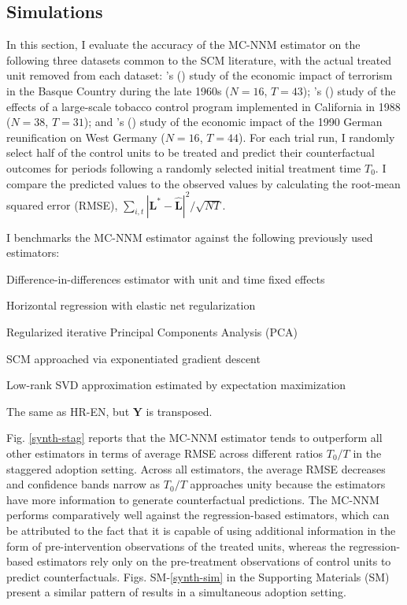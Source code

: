 \documentclass[12pt]{article}
\newcommand{\possessivecite}[1]{\citeauthor{#1}'s (\citeyear{#1})}
\begin{document}
\subsection{Simulations} \label{sims}

In this section, I evaluate the accuracy of the MC-NNM estimator on the following three datasets common to the SCM literature, with the actual treated unit removed from each dataset: \possessivecite{abadie2003economic} study of the economic impact of terrorism in the Basque Country during the late 1960s ($N=16$, $T=43$); \possessivecite{abadie2010synthetic} study of the effects of a large-scale tobacco control program implemented in California in 1988 ($N=38$, $T=31$); and \possessivecite{abadie2015comparative} study of the economic impact of the 1990 German reunification on West Germany ($N=16$, $T=44$). For each trial run, I randomly select half of the control units to be treated and predict their counterfactual outcomes for periods following a randomly selected initial treatment time $T_0$. I compare the predicted values to the observed values by calculating the root-mean squared error (RMSE), $\sum_{i,t}|\mathbf{L^{*}} -\hat{\mathbf{L}}|^2 / \sqrt{NT}$. 

I benchmarks the MC-NNM estimator against the following previously used estimators:

\begin{description}
	{\setlength\itemindent{1mm}
		\item[DID] Difference-in-differences estimator with unit and time fixed effects \citep{athey2018design}
		\item[HR-EN] Horizontal regression with elastic net regularization \citep{athey2017matrix} 
		\item[PCA] Regularized iterative Principal Components Analysis (PCA) \citep{ilin2010practical,josse2012handling}
		\item[SC-ADH] SCM approached via exponentiated gradient descent \citep{abadie2010synthetic}
		\item[SVD] Low-rank SVD approximation estimated by expectation maximization \citep{troyanskaya2001missing}
		\item[VT-EN] The same as HR-EN, but $\mathbf{Y}$ is transposed.
	}
\end{description}
%
Fig. \ref{synth-stag} reports that the MC-NNM estimator tends to outperform all other estimators in terms of average RMSE across different ratios $T_0/T$ in the staggered adoption setting. Across all estimators, the average RMSE decreases and confidence bands narrow as $T_0/T$ approaches unity because the estimators have more information to generate counterfactual predictions. The MC-NNM performs comparatively well against the regression-based estimators, which can be attributed to the fact that it is capable of using additional information in the form of pre-intervention observations of the treated units, whereas the regression-based estimators rely only on the pre-treatment observations of control units to predict counterfactuals. Figs. SM-\ref{synth-sim} in the Supporting Materials (SM) present a similar pattern of results in a simultaneous adoption setting.
\end{document}
